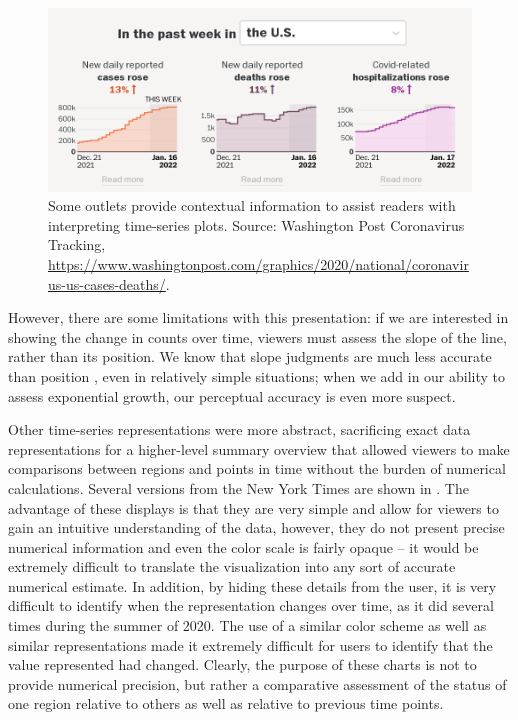 \documentclass[article]{jdssv}\usepackage[]{graphicx}\usepackage[]{color}
\begin{document}
\begin{figure}
\centering
\includegraphics[width=.5\linewidth]{wapo-covid-context}
\caption{Some outlets provide contextual information to assist readers with interpreting time-series plots. Source: Washington Post Coronavirus Tracking, \url{https://www.washingtonpost.com/graphics/2020/national/coronavirus-us-cases-deaths/}.}
\label{fig:wapo-context}
\end{figure}

However, there are some limitations with this presentation: if we are interested in showing the change in counts over time, viewers must assess the slope of the line, rather than its position. We know that slope judgments are much less accurate than position \citep{clevelandGraphicalPerceptionVisual1987}, even in relatively simple situations; when we add in our ability to assess exponential growth, our perceptual accuracy is even more suspect.

Other time-series representations were more abstract, sacrificing exact data representations for a higher-level summary overview that allowed viewers to make comparisons between regions and points in time without the burden of numerical calculations. Several versions from the New York Times are shown in . The advantage of these displays is that they are very simple and allow for viewers to gain an intuitive understanding of the data, however, they do not present precise numerical information and even the color scale is fairly opaque -- it would be extremely difficult to translate the visualization into any sort of accurate numerical estimate. In addition, by hiding these details from the user, it is very difficult to identify when the representation changes over time, as it did several times during the summer of 2020. The use of a similar color scheme as well as similar representations made it extremely difficult for users to identify that the value represented had changed. Clearly, the purpose of these charts is not to provide numerical precision, but rather a comparative assessment of the status of one region relative to others as well as relative to previous time points. 
\end{document}
